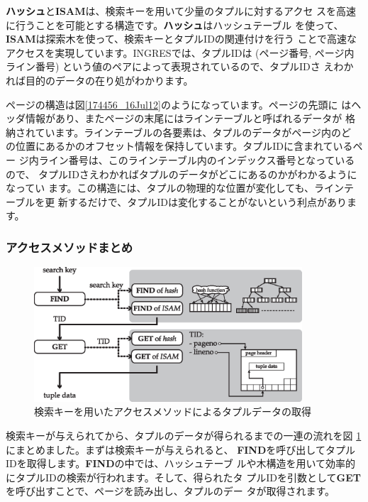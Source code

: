 {\bf ハッシュ}と{\bf ISAM}は、検索キーを用いて少量のタプルに対するアクセ
スを高速に行うことを可能とする構造です。{\bf ハッシュ}はハッシュテーブル
を使って、{\bf ISAM}は探索木を使って、検索キーとタプルIDの関連付けを行う
ことで高速なアクセスを実現しています。INGRESでは、タプルIDは (ページ番号,
ページ内ライン番号) という値のペアによって表現されているので、タプルIDさ
えわかれば目的のデータの在り処がわかります。


ページの構造は図\ref{174456_16Jul12}のようになっています。ページの先頭に
はヘッダ情報があり、またページの末尾にはラインテーブルと呼ばれるデータが
格納されています。ラインテーブルの各要素は、タプルのデータがページ内のど
の位置にあるかのオフセット情報を保持しています。タプルIDに含まれているペー
ジ内ライン番号は、このラインテーブル内のインデックス番号となっているので、
タプルIDさえわかればタプルのデータがどこにあるのかがわかるようになってい
ます。この構造には、タプルの物理的な位置が変化しても、ラインテーブルを更
新するだけで、タプルIDは変化することがないという利点があります。


\subsubsection{アクセスメソッドまとめ}


\begin{figure}
 \begin{center}
  \includegraphics[width=100mm]{hayamiz/images/access-method.eps}
  \caption{検索キーを用いたアクセスメソッドによるタプルデータの取得}
  \label{190817_16Jul12}
 \end{center}
\end{figure}


検索キーが与えられてから、タプルのデータが得られるまでの一連の流れを図
\ref{190817_16Jul12}にまとめました。まずは検索キーが与えられると、{\bf
FIND}を呼び出してタプルIDを取得します。{\bf FIND}の中では、ハッシュテーブ
ルや木構造を用いて効率的にタプルIDの検索が行われます。そして、得られたタ
プルIDを引数として{\bf GET}を呼び出すことで、ページを読み出し、タプルのデー
タが取得されます。


